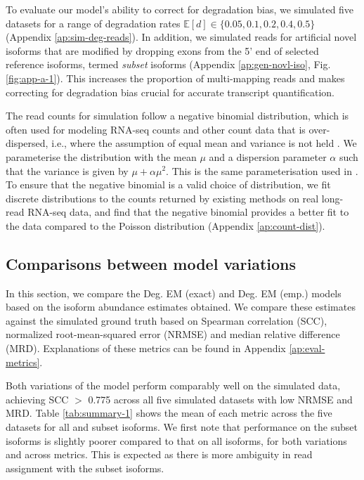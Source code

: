 To evaluate our model's ability to correct for degradation bias, we simulated five datasets for a range of degradation rates $\mathbb{E}[d]\in\{0.05,0.1,0.2,0.4,0.5\}$ (Appendix \ref{ap:sim-deg-reads}). In addition, we simulated reads for artificial novel isoforms that are modified by dropping exons from the 5' end of selected reference isoforms, termed \textit{subset} isoforms (Appendix \ref{ap:gen-novl-iso}, Fig. \ref{fig:app-a-1}). This increases the proportion of multi-mapping reads and makes correcting for degradation bias crucial for accurate transcript quantification. 

The read counts for simulation follow a negative binomial distribution, which is often used for modeling RNA-seq counts and other count data that is over-dispersed, i.e., where the assumption of equal mean and variance is not held \cite{Cameron2013, Anders2010, Robinson2010}. We parameterise the distribution with the mean $\mu$ and a dispersion parameter $\alpha$ such that the variance is given by $\mu+\alpha\mu^2$. This is the same parameterisation used in \cite{Robinson2010}. To ensure that the negative binomial is a valid choice of distribution, we fit discrete distributions to the counts returned by existing methods on real long-read RNA-seq data, and find that the negative binomial provides a better fit to the data compared to the Poisson distribution (Appendix \ref{ap:count-dist}).   

\subsection{Comparisons between model variations}

In this section, we compare the Deg. EM (exact) and Deg. EM (emp.) models based on the isoform abundance estimates obtained. We compare these estimates against the simulated ground truth based on Spearman correlation (SCC), normalized root-mean-squared error (NRMSE) and median relative difference (MRD). Explanations of these metrics can be found in Appendix \ref{ap:eval-metrics}.  

Both variations of the model perform comparably well on the simulated data, achieving SCC $>$ 0.775 across all five simulated datasets with low NRMSE and MRD. Table \ref{tab:summary-1} shows the mean of each metric across the five datasets for all and subset isoforms. We first note that performance on the subset isoforms is slightly poorer compared to that on all isoforms, for both variations and across metrics. This is expected as there is more ambiguity in read assignment with the subset isoforms. 

